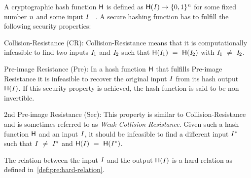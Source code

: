\begin{definition}\label{def:pre:hash-function}
    A cryptographic hash function $\mathsf{H}$ is defined as $\mathsf{H} (\mathit{I}) \rightarrow \{0,1\}^{\mathit{n}}$ for some fixed number $\mathit{n}$ and some input $\mathit{I}$ ~\cite{al2011cryptographic}.
    A secure hashing function has to fulfill the following security properties:
    \begin{asparaitem}
        \item Collision-Resistance (CR): Collision-Resistance means that it is computationally infeasible to find two inputs $\mathit{I}_1$ and $\mathit{I}_2$ such that
        $\mathsf{H} (\mathit{I}_1) ~=~ \mathsf{H} (\mathit{I}_2)$ with $\mathit{I}_1 ~\neq~ \mathit{I}_2$.
        \item Pre-image Resistance (Pre): In a hash function $\mathsf{H}$ that fulfills Pre-image Resistance it is infeasible to recover the original input $\mathit{I}$ from its hash output $\mathsf{H} (\mathit{I})$.
        If this security property is achieved, the hash function is said to be non-invertible.
        \item 2nd Pre-image Resistance (Sec):  This property is similar to Collision-Resistance and is sometimes referred to as \textit{Weak Collision-Resistance}.
        Given such a hash function $\mathsf{H}$ and an input $\mathit{I}$, it should be infeasible to find a different input $\mathit{I}^*$ such that $\mathit{I} ~\neq~ \mathit{I}^*$
        and $\mathsf{H} (\mathit{I}) ~=~ \mathsf{H} (\mathit{I}^*)$.
    \end{asparaitem}
    The relation between the input $\mathit{I}$ and the output $\mathsf{H} (\mathit{I})$ is a hard relation as defined in~\cref{def:pre:hard-relation}.
\end{definition}

